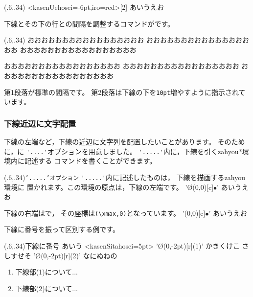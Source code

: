 \begin{showEx}(.6,.34){}
\phkasen<kasenUehosei=-6pt,iro=red>[2]%
  {あいうえお}
\end{showEx}

下線とその下の行との間隔を調整するコマンドがです。

\begin{showEx}(.6,.34){}
おおおおおおおおおおおおおおおおお
おおおおおおおおおおおおおおおおお
おおおおおおおおおおおおおおおおお

\kasenSitahosei{10pt}%
おおおおおおおおおおおおおおおおお
おおおおおおおおおおおおおおおおお
おおおおおおおおおおおおおおおおお
\end{showEx}

第1段落が標準の間隔です。
第2段落は下線の下を\texttt{10pt}増やすように指示されています。

\subsubsection{下線近辺に文字配置}\label{sayuu}
下線の左端など，下線の近辺に文字列を配置したいことがあります。
そのために，に
\verb+'....'+オプションを用意しました。
\verb+'.....'+内に，下線を引く\textsf{zahyou*}環境内に記述する
コマンドを書くことができます。

\begin{showEx}(.6,.34){\texttt{'.....'オプション}}
\verb+'.....'+内に記述したものは，
下線を描画する\textsf{zahyou}環境に
置かれます。この環境の原点は，下線の左端です。
\phkasen%
  '\Put\O(0,0)[c]{$\bullet$}'%
  {あいうえお}

下線の右端はで，
その座標は\verb+(\xmax,0)+となっています。
\phkasen%
  '\Put\XMAX(0,0)[c]{$\bullet$}'%
  {あいうえお}
\end{showEx}

下線に番号を振って区別する例です。

\begin{showEx}(.6,.34){下線に番号}
あいう
\phkasen<kasenSitahosei=5pt>%
  '\Put\O(0,-2pt)[r]{\scriptsize (1)}'%
  {かきくけこ}
さしすせそ
\phkasen%
  '\Put\O(0,-2pt)[r]{\scriptsize (2)}'%
  {なにぬねの}
\begin{enumerate}[(1)]
  \item 下線部(1)について...
  \item 下線部(2)について...
\end{enumerate}
\end{showEx}

